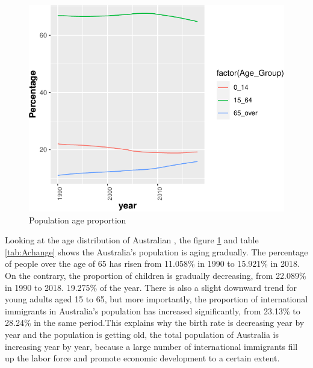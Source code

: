 \documentclass[11pt,a4paper,]{article}
\begin{document}
\begin{figure}[H]

{\centering \includegraphics{Figures/A1-1} 

}

\caption{Population age proportion}\label{fig:A1}
\end{figure}

Looking at the age distribution of Australian , the figure \ref{fig:A1} and table \ref{tab:Achange} shows the Australia's population is aging gradually. The percentage of people over the age of 65 has risen from 11.058\% in 1990 to 15.921\% in 2018. On the contrary, the proportion of children is gradually decreasing, from 22.089\% in 1990 to 2018. 19.275\% of the year. There is also a slight downward trend for young adults aged 15 to 65, but more importantly, the proportion of international immigrants in Australia's population has increased significantly, from 23.13\% to 28.24\% in the same period.This explains why the birth rate is decreasing year by year and the population is getting old, the total population of Australia is increasing year by year, because a large number of international immigrants fill up the labor force and promote economic development to a certain extent.
\end{document}
